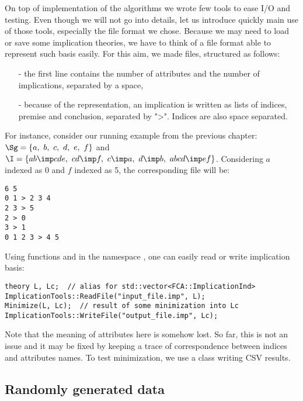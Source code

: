 On top of implementation of the algorithms we wrote few tools to ease I/O and
testing. Even though we will not go into details, let us introduce quickly
main use of those tools, especially the file format we chose. Because we may need to load or save some implication theories, we have to think of a file format able to represent such basis easily. For this aim, we made 
files, structured as follows:
\begin{itemize}
	\item[-] the first line contains the number of attributes and the number of
	implications, separated by a space,
	\item[-] because of the  representation, an implication is 
	written as lists of indices, premise and conclusion, separated by ">". Indices are also space separated.
\end{itemize}
For instance, consider our running example from the previous chapter:
$\Sg = \{ a, \ b, \  c, \  d, \  e, \ f \}$ and $\I = \{ ab \imp cde, \ cd \imp f, \ c \imp a, \ d \imp b, \  abcd \imp  ef \}$. Considering $a$ indexed as 0 and $f$ indexed as 5, the corresponding  file will be:

\begin{lstlisting}[language = inline, style = Light]
6 5
0 1 > 2 3 4
2 3 > 5
2 > 0
3 > 1
0 1 2 3 > 4 5
\end{lstlisting}

\noindent Using functions  and  in the namespace , one can easily read or write implication basis:

\begin{lstlisting}[language = CoreCpp, style = Light]
theory L, Lc;  // alias for std::vector<FCA::ImplicationInd>
ImplicationTools::ReadFile("input_file.imp", L);
Minimize(L, Lc);  // result of some minimization into Lc
ImplicationTools::WriteFile("output_file.imp", Lc);
\end{lstlisting}

\noindent Note that the meaning of attributes here is somehow lost. So far, this is not an issue and it may be fixed by keeping a trace of correspondence between indices and attributes names. To test minimization, we use a class
 writing CSV results.

\subsection{Randomly generated data}

